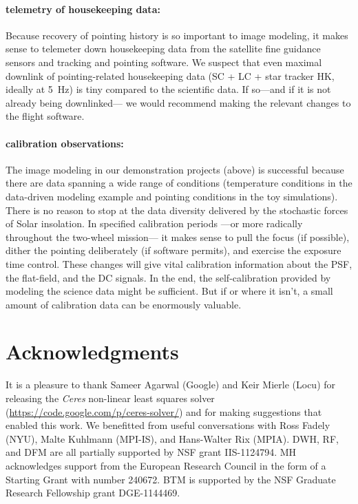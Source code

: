 \documentclass[letterpaper,12pt,whitepaper]{haastex}
\newcommand{\project}[1]{\textsl{#1}}
\begin{document}
\paragraph{telemetry of housekeeping data:}
Because recovery of pointing history is so important to image modeling,
  it makes sense to telemeter down housekeeping data from the
  satellite fine guidance sensors and tracking and pointing software.
We suspect that even maximal downlink of pointing-related housekeeping data
  (SC + LC + star tracker HK, ideally at 5~Hz)
  is tiny compared to the scientific data.
If so---and if it is not already being downlinked---%
  we would recommend making the relevant changes to the flight software.

\paragraph{calibration observations:}
The image modeling in our demonstration projects (above) is successful
  because there are data spanning a wide range of conditions
  (temperature conditions in the data-driven modeling example
   and pointing conditions in the toy simulations).
There is no reason to stop at the data diversity delivered by the
  stochastic forces of Solar insolation.
In specified calibration periods%
  ---or more radically throughout the two-wheel mission---%
  it makes sense to pull the focus (if possible),
  dither the pointing deliberately (if software permits),
  and exercise the exposure time control.
These changes will give vital calibration information about
  the PSF, the flat-field, and the DC signals.
In the end, the self-calibration provided by modeling the science
  data might be sufficient.
But if or where it isn't, a small amount of calibration data can be enormously valuable.

\section{Acknowledgments}

It is a pleasure to thank Sameer Agarwal (Google) and Keir Mierle
  (Locu) for releasing the \project{Ceres} non-linear least squares
  solver (\url{https://code.google.com/p/ceres-solver/}) and for making
  suggestions that enabled this work.
We benefitted from useful conversations with
  Ross Fadely (NYU),
  Malte Kuhlmann (MPI-IS), and
  Hans-Walter Rix (MPIA).
DWH, RF, and DFM are all partially supported by NSF grant IIS-1124794.
MH acknowledges support from the European Research Council in the form of a Starting Grant with number 240672.
BTM is supported by the NSF Graduate Research Fellowship grant DGE-1144469.
\end{document}
